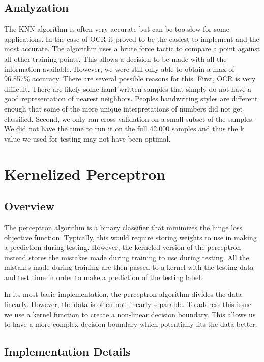 \documentclass{article} %
\begin{document}
\subsection{Analyzation}

The KNN algorithm is often very accurate but can be too slow for some applications. 
In the case of OCR it proved to be the easiest to implement and the most accurate. 
The algorithm uses a brute force tactic to compare a point against all other training
points.  This allows a decision to be made with all the information available.  However,
we were still only able to obtain a max of 96.857\% accuracy.  There are several possible
reasons for this.  First, OCR is very difficult.  There are likely some hand written samples
that simply do not have a good representation of nearest neighbors. Peoples handwriting 
styles are different enough that some of the more unique interpretations of numbers did 
not get classified. Second, we only ran cross validation on a small subset of the samples.  
We did not have the time to run it on the full 42,000 samples and thus the k value we used 
for testing may not have been optimal. 

\section{Kernelized Perceptron}
\subsection{Overview}

The perceptron algorithm is a binary classifier that minimizes the hinge loss objective
function.  Typically, this would require storing weights to use in making a prediction 
during testing. However, the kerneled version of the perceptron instead stores the
mistakes made during training to use during testing. All the mistakes made during
training are then passed to a kernel with the testing data and test time in order to
make a prediction of the testing label.

In its most basic implementation, the perceptron algorithm divides the data
linearly. However, the data is often not linearly separable. To address this
issue we use a kernel function to create a non-linear decision boundary. This
allows us to have a more complex decision boundary which potentially fits the
data better. 

\subsection{Implementation Details}
\end{document}
